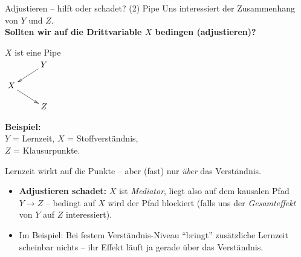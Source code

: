 \documentclass[
  10pt,
  ignorenonframetext,
]{beamer}
\providecommand{\tightlist}{%
  \setlength{\itemsep}{0pt}\setlength{\parskip}{0pt}}
\begin{document}
\begin{frame}{Adjustieren -- hilft oder schadet? (2) Pipe}
\protect\hypertarget{adjustieren-hilft-oder-schadet-2-pipe}{}
Uns interessiert der Zusammenhang von \(Y\) und \(Z\).\\
\textbf{Sollten wir auf die Drittvariable \(X\) bedingen (adjustieren)?}

\columnsbegin
\column{3.7cm}
\begin{center}
$X$ ist eine Pipe\\[.3em]
$\xymatrix@R-1pc{
 & Y \ar[dl] \\ X \ar[dr] & \\ & Z
}$
\end{center}
\column{7cm}
\small

\textbf{Beispiel:}\\
\(Y\) = Lernzeit, \(X\) = Stoffverständnis,\\
\(Z\) = Klausurpunkte.

Lernzeit wirkt auf die Punkte -- aber (fast) nur \emph{über} das
Verständnis. \columnsend

\begin{itemize}[<+->]
\tightlist
\item
  \textbf{Adjustieren schadet:} \(X\) ist \emph{Mediator}, liegt also
  auf dem kausalen Pfad \(Y \to Z\) -- bedingt auf \(X\) wird der Pfad
  blockiert (falls uns der \emph{Gesamteffekt} von \(Y\) auf \(Z\)
  interessiert).
\item
  Im Beispiel: Bei festem Verständnis-Niveau ``bringt'' zusätzliche
  Lernzeit scheinbar nichts -- ihr Effekt läuft ja gerade über das
  Verständnis.
\end{itemize}
\end{frame}
\end{document}
